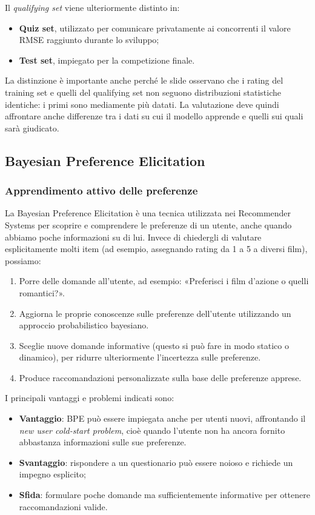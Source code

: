 Il \emph{qualifying set} viene ulteriormente distinto in:
\begin{itemize}
    \item \textbf{Quiz set}, utilizzato per comunicare privatamente ai concorrenti il valore RMSE raggiunto durante lo sviluppo;
    \item \textbf{Test set}, impiegato per la competizione finale.
\end{itemize}
La distinzione è importante anche perché le slide osservano che i rating del training set e quelli del qualifying set non seguono distribuzioni statistiche identiche: i primi sono mediamente più datati. La valutazione deve quindi affrontare anche differenze tra i dati su cui il modello apprende e quelli sui quali sarà giudicato.

\subsection{Bayesian Preference Elicitation}

\subsubsection{Apprendimento attivo delle preferenze}
La Bayesian Preference Elicitation è una tecnica utilizzata nei Recommender Systems per scoprire e comprendere le preferenze di un utente, anche quando abbiamo poche informazioni su di lui.
Invece di chiedergli di valutare esplicitamente molti item (ad esempio, assegnando rating da 1 a 5 a diversi film), possiamo:
\begin{enumerate}
    \item Porre delle domande all'utente, ad esempio: «Preferisci i film d'azione o quelli romantici?».
    \item Aggiorna le proprie conoscenze sulle preferenze dell'utente utilizzando un approccio probabilistico bayesiano.
    \item Sceglie nuove domande informative (questo si può fare in modo statico o dinamico), per ridurre ulteriormente l'incertezza sulle preferenze.
    \item Produce raccomandazioni personalizzate sulla base delle preferenze apprese.
\end{enumerate}
I principali vantaggi e problemi indicati sono:
\begin{itemize}
    \item \textbf{Vantaggio}: BPE può essere impiegata anche per utenti nuovi, affrontando il \emph{new user cold-start problem}, cioè quando l'utente non ha ancora fornito abbastanza informazioni sulle sue preferenze.
    \item \textbf{Svantaggio}: rispondere a un questionario può essere noioso e richiede un impegno esplicito;
    \item \textbf{Sfida}: formulare poche domande ma sufficientemente informative per ottenere raccomandazioni valide.
\end{itemize}

